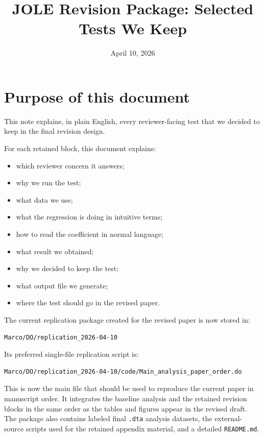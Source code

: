 \documentclass[11pt]{article}
\title{JOLE Revision Package: Selected Tests We Keep}
\author{}
\date{April 10, 2026}
\begin{document}
\maketitle

\section*{Purpose of this document}

This note explains, in plain English, every reviewer-facing test that we decided to keep in the final revision design.

For each retained block, this document explains:
\begin{itemize}[leftmargin=*]
\item which reviewer concern it answers;
\item why we run the test;
\item what data we use;
\item what the regression is doing in intuitive terms;
\item how to read the coefficient in normal language;
\item what result we obtained;
\item why we decided to keep the test;
\item what output file we generate;
\item where the test should go in the revised paper.
\end{itemize}

The current replication package created for the revised paper is now stored in:

\begin{verbatim}
Marco/DO/replication_2026-04-10
\end{verbatim}

Its preferred single-file replication script is:

\begin{verbatim}
Marco/DO/replication_2026-04-10/code/Main_analysis_paper_order.do
\end{verbatim}

This is now the main file that should be used to reproduce the current paper in manuscript order. It integrates the baseline analysis and the retained revision blocks in the same order as the tables and figures appear in the revised draft. The package also contains labeled final \texttt{.dta} analysis datasets, the external-source scripts used for the retained appendix material, and a detailed \texttt{README.md}.
\end{document}
